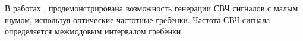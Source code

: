 В работах \cite{Herr2012}, \cite{Savchenkov2008} продемонстрирована возможность генерации СВЧ сигналов с малым шумом, используя оптические частотные гребенки. Частота СВЧ сигнала определяется межмодовым интервалом гребенки.



